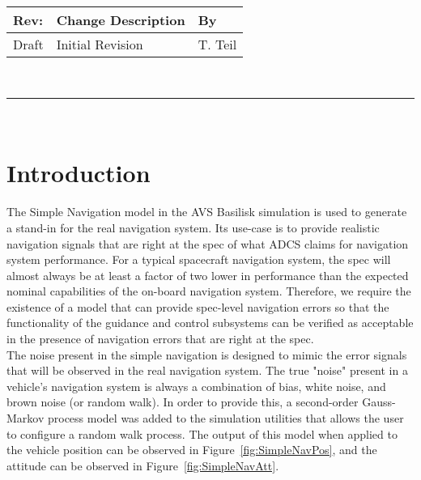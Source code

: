 \documentclass[]{BasiliskReportMemo}
\begin{document}
\makeCover


%
%
\pagestyle{empty}
{\renewcommand{\arraystretch}{2}
\noindent
\begin{longtable}{|p{0.5in}|p{4.5in}|p{1.14in}|}
\hline
{\bfseries Rev}: & {\bfseries Change Description} & {\bfseries By} \\
\hline
Draft & Initial Revision & T. Teil \\
\hline

\end{longtable}
}

\newpage
\setcounter{page}{1}
\pagestyle{fancy}

\tableofcontents
~\\ \hrule ~\\


\section{Introduction}
The Simple Navigation model in the AVS Basilisk simulation is used to generate 
a stand-in for the real navigation system.  Its use-case is to provide realistic 
navigation signals that are right at the spec of what ADCS claims for navigation 
system performance.  For a typical spacecraft navigation system, the spec will 
almost always be at least a factor of two lower in performance than the expected 
nominal capabilities of the on-board navigation system.  Therefore, we require 
the existence of a model that can provide spec-level navigation errors so that 
the functionality of the guidance and control subsystems can be verified as 
acceptable in the presence of navigation errors that are right at the spec. \\

The noise present in the simple navigation is designed to mimic the error signals 
that will be observed in the real navigation system.  The true "noise" present 
in a vehicle's navigation system is always a combination of bias, white noise, 
and brown noise (or random walk).  In order to provide this, a second-order 
Gauss-Markov process model was added to the simulation utilities that allows 
the user to configure a random walk process.  The output of this model when 
applied to the vehicle position can be observed in Figure~\ref{fig:SimpleNavPos}, 
and the attitude can be observed in Figure~\ref{fig:SimpleNavAtt}.
\end{document}
